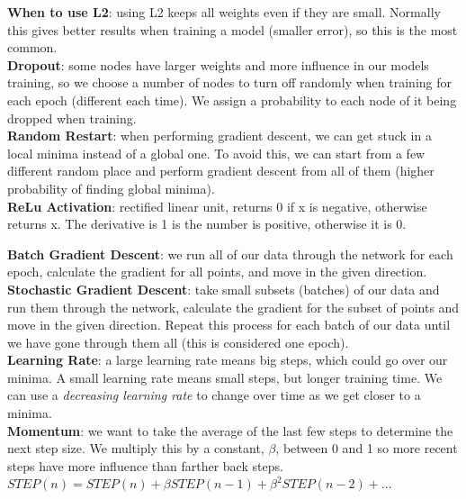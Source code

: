 \documentclass[11pt, a4paper]{article}
\begin{document}
\begin{spacing}{1.1}
	\textbf{When to use L2}: using L2 keeps all weights even if they are small. Normally this gives better results when training a model (smaller error), so this is the most common.\vspace*{2mm}\\
	\textbf{Dropout}: some nodes have larger weights and more influence in our models training, so we choose a number of nodes to turn off randomly when training for each epoch (different each time). We assign a probability to each node of it being dropped when training.\vspace*{2mm}\\
	\textbf{Random Restart}: when performing gradient descent, we can get stuck in a local minima instead of a global one. To avoid this, we can start from a few different random place and perform gradient descent from all of them (higher probability of finding global minima). \vspace*{2mm}\\
	\textbf{ReLu Activation}: rectified linear unit, returns 0 if x is negative, otherwise returns x. The derivative is 1 is the number is positive, otherwise it is 0. \newpage

	\noindent \textbf{Batch Gradient Descent}: we run all of our data through the network for each epoch, calculate the gradient for all points, and move in the given direction.  \vspace*{2mm}\\
	\textbf{Stochastic Gradient Descent}: take small subsets (batches) of our data and run them through the network, calculate the gradient for the subset of points and move in the given direction. Repeat this process for each batch of our data until we have gone through them all (this is considered one epoch). \vspace*{2mm}\\
	\textbf{Learning Rate}: a large learning rate means big steps, which could go over our minima. A small learning rate means small steps, but longer training time. We can use a \textit{decreasing learning rate} to change over time as we get closer to a minima.\vspace*{2mm}\\
	\textbf{Momentum}: we want to take the average of the last few steps to determine the next step size. We multiply this by a constant, $\beta$, between 0 and 1 so more recent steps have more influence than farther back steps. $STEP(n) = STEP(n) + \beta STEP(n-1) + \beta^2 STEP(n-2)+...$\vspace*{3mm}
	

\end{spacing}
\end{document}
